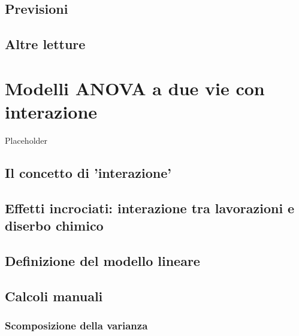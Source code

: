 \documentclass[a4paper,12pt,oneside]{book}
\begin{document}
\hypertarget{previsioni}{%
\section{Previsioni}\label{previsioni}}

\hypertarget{altre-letture-9}{%
\section{Altre letture}\label{altre-letture-9}}

\hypertarget{modelli-anova-a-due-vie-con-interazione}{%
\chapter{Modelli ANOVA a due vie con interazione}\label{modelli-anova-a-due-vie-con-interazione}}

Placeholder

\hypertarget{il-concetto-di-interazione}{%
\section{Il concetto di 'interazione'}\label{il-concetto-di-interazione}}

\hypertarget{effetti-incrociati-interazione-tra-lavorazioni-e-diserbo-chimico}{%
\section{Effetti incrociati: interazione tra lavorazioni e diserbo chimico}\label{effetti-incrociati-interazione-tra-lavorazioni-e-diserbo-chimico}}

\hypertarget{definizione-del-modello-lineare-1}{%
\section{Definizione del modello lineare}\label{definizione-del-modello-lineare-1}}

\hypertarget{calcoli-manuali}{%
\section{Calcoli manuali}\label{calcoli-manuali}}

\hypertarget{scomposizione-della-varianza-2}{%
\subsection{Scomposizione della varianza}\label{scomposizione-della-varianza-2}}
\end{document}
